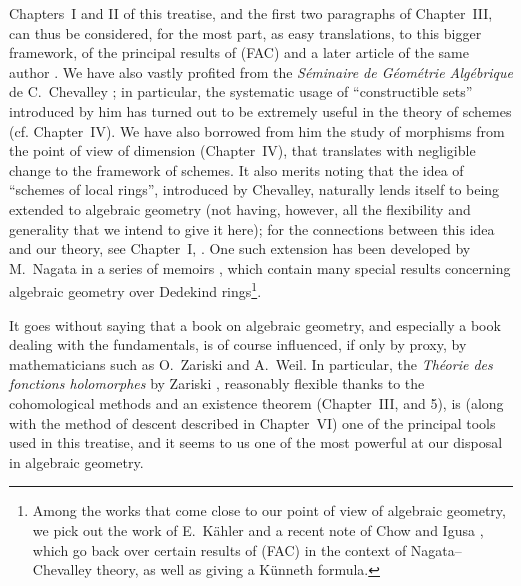 Chapters~I and II of this treatise, and the first two paragraphs of Chapter~III, can thus be considered, for the most part, as easy translations, to this bigger framework, of the principal results of (FAC) and a later article of the same author \cite{I-15}.
We have also vastly profited from the \emph{S\'eminaire de G\'eom\'etrie Alg\'ebrique} de C.~Chevalley \cite{I-1};
in particular, the systematic usage of ``constructible sets'' introduced by him has turned out to be extremely useful in the theory of schemes (cf. Chapter~IV).
We have also borrowed from him the study of morphisms from
the point of view of dimension (Chapter~IV), that translates with negligible change to the framework of schemes.
It also merits noting that the idea of ``schemes of local rings'', introduced by Chevalley, naturally lends itself to being extended to algebraic geometry (not having, however, all the flexibility and generality that we intend to give it here);
for the connections between this idea and our theory, see Chapter~I, .
One such extension has been developed by M.~Nagata in a series of memoirs \cite{I-9}, which contain many special results concerning algebraic geometry over Dedekind rings\footnote{Among the works that come close to our point of view of algebraic geometry, we pick out the work of E.~K\"ahler \cite{I-22} and a recent note of Chow and Igusa \cite{I-3}, which go back over certain results of (FAC) in the context of Nagata--Chevalley theory, as well as giving a K\"unneth formula.}.

\sectionbreak

It goes without saying that a book on algebraic geometry, and especially a book dealing with the fundamentals, is of course influenced, if only by proxy, by mathematicians such as O.~Zariski and A.~Weil.
In particular, the \emph{Th\'eorie des fonctions holomorphes} by Zariski \cite{I-20}, reasonably flexible thanks to the cohomological methods and an existence theorem (Chapter~III, \textsection{} and 5), is (along with the method of descent described in Chapter~VI) one of the principal tools used in this treatise, and it seems to us one of the most powerful at our disposal in algebraic geometry.

